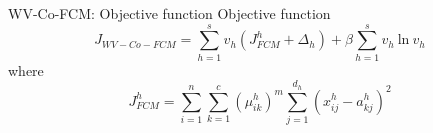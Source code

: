 \documentclass[compress,sky blue]{beamer}
\begin{document}


\begin{frame}{WV-Co-FCM: Objective function}
	\vspace{-0.3cm}	
Objective function \cite{Jiang2015CollaborativeViews}    
\begin{equation}
J_{WV-Co-FCM}   = \sum_{h=1}^{s}v_{h} \left( J_{FCM}^{h} + \Delta_{h} \right)+\beta\sum_{h=1}^{s} v_{h} \ \text{ln} \ v_{h}
\label{Co-FKM} 
\end{equation}
where \begin{equation*}
J_{FCM}^{h}=\sum_{i=1}^{n}\sum_{k=1}^{c} \left(\mu_{ik}^{h} \right)^{m} \sum_{j=1}^{d_{h}} \left(x_{ij}^{h}-a_{kj}^{h}\right)^2
\label{Delta} 
\end{equation*} 

\end{frame}


\end{document}
